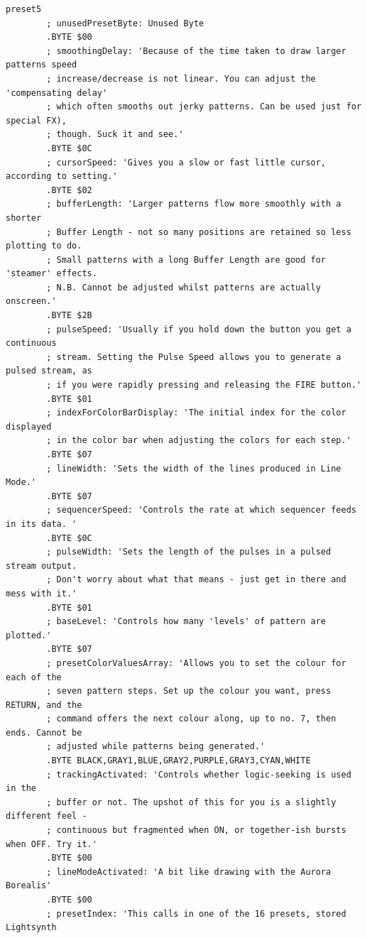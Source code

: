 \begin{lstlisting}[basicstyle=\ttfamily\tiny,caption=Source code for Preset 5.]
preset5
        ; unusedPresetByte: Unused Byte
        .BYTE $00
        ; smoothingDelay: 'Because of the time taken to draw larger patterns speed
        ; increase/decrease is not linear. You can adjust the 'compensating delay'
        ; which often smooths out jerky patterns. Can be used just for special FX),
        ; though. Suck it and see.'
        .BYTE $0C
        ; cursorSpeed: 'Gives you a slow or fast little cursor, according to setting.'
        .BYTE $02
        ; bufferLength: 'Larger patterns flow more smoothly with a shorter
        ; Buffer Length - not so many positions are retained so less plotting to do.
        ; Small patterns with a long Buffer Length are good for 'steamer' effects.
        ; N.B. Cannot be adjusted whilst patterns are actually onscreen.'
        .BYTE $2B
        ; pulseSpeed: 'Usually if you hold down the button you get a continuous
        ; stream. Setting the Pulse Speed allows you to generate a pulsed stream, as
        ; if you were rapidly pressing and releasing the FIRE button.'
        .BYTE $01
        ; indexForColorBarDisplay: 'The initial index for the color displayed
        ; in the color bar when adjusting the colors for each step.'
        .BYTE $07
        ; lineWidth: 'Sets the width of the lines produced in Line Mode.'
        .BYTE $07
        ; sequencerSpeed: 'Controls the rate at which sequencer feeds in its data. '
        .BYTE $0C
        ; pulseWidth: 'Sets the length of the pulses in a pulsed stream output.
        ; Don't worry about what that means - just get in there and mess with it.'
        .BYTE $01
        ; baseLevel: 'Controls how many 'levels' of pattern are plotted.'
        .BYTE $07
        ; presetColorValuesArray: 'Allows you to set the colour for each of the
        ; seven pattern steps. Set up the colour you want, press RETURN, and the
        ; command offers the next colour along, up to no. 7, then ends. Cannot be
        ; adjusted while patterns being generated.'
        .BYTE BLACK,GRAY1,BLUE,GRAY2,PURPLE,GRAY3,CYAN,WHITE
        ; trackingActivated: 'Controls whether logic-seeking is used in the
        ; buffer or not. The upshot of this for you is a slightly different feel -
        ; continuous but fragmented when ON, or together-ish bursts when OFF. Try it.'
        .BYTE $00
        ; lineModeActivated: 'A bit like drawing with the Aurora Borealis'
        .BYTE $00
        ; presetIndex: 'This calls in one of the 16 presets, stored Lightsynth

\end{lstlisting}
